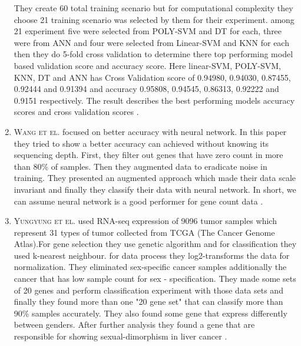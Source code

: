 \begin{enumerate}
  They create 60 total training scenario but for computational complexity they choose 21 training scenario was selected by them for their experiment. among 21 experiment five were selected from POLY-SVM and DT for each, three were from ANN and four were selected from Linear-SVM and KNN for each then they do 5-fold cross validation to determine there top performing model based validation score and accuracy score. Here linear-SVM, POLY-SVM, KNN, DT and ANN has Cross Validation score of 0.94980, 0.94030, 0.87455, 0.92444 and 0.91394 and accuracy 0.95808, 0.94545, 0.86313, 0.92222 and 0.9151 respectively.
The result describes the best performing models accuracy scores and cross validation scores \cite{pmid30441551}.
  
  \item \textsc{Wang et el.} focused on better accuracy with neural network. In this paper they tried to show a better accuracy can achieved without knowing its sequencing depth. First, they filter out genes that have zero count in more than 80\% of samples. Then they augmented data to eradicate noise in training. They presented an augmented approach which made their data scale invariant and finally they classify their data with neural network. In short, we can assume neural network is a good performer for gene count data \cite{10.1093/bioinformatics/btz801}. 
  \item \textsc{Yungyung et el.} used RNA-seq expression of 9096 tumor samples which represent 31 types of tumor collected from TCGA (The Cancer Genome Atlas).For gene selection they use genetic algorithm and for classification they used k-nearest neighbour. for data process they  log2-transforms the data for normalization. They eliminated sex-specific cancer samples additionally the cancer that has low sample count for sex - specification. They made some sets of 20 genes and perform classification experiment with those data sets and finally they found more than one "20 gene set" that can classify more than 90\% samples accurately. They also found some gene that express differently between genders. After further analysis they found a gene that are responsible for showing sexual-dimorphism in liver cancer \cite{pmid28673244}. 
  

\end{enumerate}
